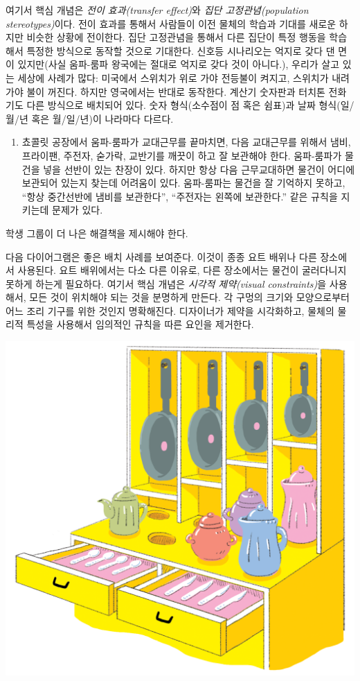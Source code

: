 \documentclass[]{article}
\begin{document}
여기서 핵심 개념은 \emph{전이 효과(transfer effect)}와 \emph{집단
고정관념(population stereotypes)}이다. 전이 효과를 통해서 사람들이 이전
물체의 학습과 기대를 새로운 하지만 비슷한 상황에 전이한다. 집단
고정관념을 통해서 다른 집단이 특정 행동을 학습해서 특정한 방식으로
동작할 것으로 기대한다. 신호등 시나리오는 억지로 갖다 댄 면이
있지만(사실 움파-룸파 왕국에는 절대로 억지로 갖다 것이 아니다.), 우리가
살고 있는 세상에 사례가 많다: 미국에서 스위치가 위로 가야 전등불이
켜지고, 스위치가 내려가야 불이 꺼진다. 하지만 영국에서는 반대로
동작한다. 계산기 숫자판과 터치톤 전화기도 다른 방식으로 배치되어 있다.
숫자 형식(소수점이 점 혹은 쉼표)과 날짜 형식(일/월/년 혹은 월/일/년)이
나라마다 다르다.

\begin{enumerate}
\itemsep1pt\parskip0pt
\item
  쵸콜릿 공장에서 움파-룸파가 교대근무를 끝마치면, 다음 교대근무를
  위해서 냄비, 프라이팬, 주전자, 숟가락, 교반기를 깨끗이 하고 잘
  보관해야 한다. 움파-룸파가 물건을 넣을 선반이 있는 찬장이 있다. 하지만
  항상 다음 근무교대하면 물건이 어디에 보관되어 있는지 찾는데 어려움이
  있다. 움파-룸파는 물건을 잘 기억하지 못하고, ``항상 중간선반에 냄비를
  보관한다'', ``주전자는 왼쪽에 보관한다.'' 같은 규칙을 지키는데 문제가
  있다.
\end{enumerate}

학생 그룹이 더 나은 해결책을 제시해야 한다.

다음 다이어그램은 좋은 배치 사례를 보여준다. 이것이 종종 요트 배위나
다른 장소에서 사용된다. 요트 배위에서는 다소 다른 이유로, 다른
장소에서는 물건이 굴러다니지 못하게 하는게 필요하다. 여기서 핵심 개념은
\emph{시각적 제약(visual constraints)}을 사용해서, 모든 것이 위치해야
되는 것을 분명하게 만든다. 각 구멍의 크기와 모양으로부터 어느 조리
기구를 위한 것인지 명확해진다. 디자이너가 제약을 시각화하고, 물체의
물리적 특성을 사용해서 임의적인 규칙을 따른 요인을 제거한다.

\includegraphics{csunplugged/06-part/img/ch20-hci/19-hci-03-cupboard.png}
\end{document}
